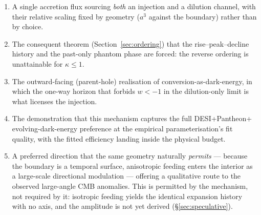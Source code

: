 \documentclass[11pt,a4paper]{article}
\begin{document}
\begin{enumerate}
\item A single accretion flux sourcing \emph{both} an injection and a dilution channel, with their relative scaling fixed by geometry ($a^3$ against the boundary) rather than by choice.
\item The consequent theorem (Section~\ref{sec:ordering}) that the rise--peak--decline history and the past-only phantom phase are forced: the reverse ordering is unattainable for $\kappa\le1$.
\item The outward-facing (parent-hole) realisation of conversion-as-dark-energy, in which the one-way horizon that forbids $w<-1$ in the dilution-only limit is what licenses the injection.
\item The demonstration that this mechanism captures the full DESI+Pantheon+ evolving-dark-energy preference at the empirical parameterisation's fit quality, with the fitted efficiency landing inside the physical budget.
\item A preferred direction that the same geometry naturally \emph{permits} --- because the boundary is a temporal surface, anisotropic feeding enters the interior as a large-scale directional modulation --- offering a qualitative route to the observed large-angle CMB anomalies. This is permitted by the mechanism, not required by it: isotropic feeding yields the identical expansion history with no axis, and the amplitude is not yet derived (\S\ref{sec:speculative}).
\end{enumerate}
\end{document}
